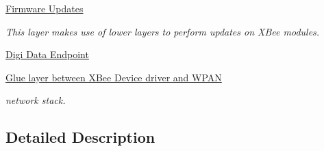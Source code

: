 \begin{DoxyCompactItemize}
\hyperlink{group__xbee__firmware}{Firmware Updates}
\begin{DoxyCompactList}\small\item\em This layer makes use of lower layers to perform updates on X\-Bee modules. \end{DoxyCompactList}\item 
\hyperlink{group__xbee__digi__data}{Digi Data Endpoint}
\item 
\hyperlink{group__xbee__wpan}{Glue layer between X\-Bee Device driver and W\-P\-A\-N}
\begin{DoxyCompactList}\small\item\em network stack. \end{DoxyCompactList}\end{DoxyCompactItemize}


\subsection{Detailed Description}
